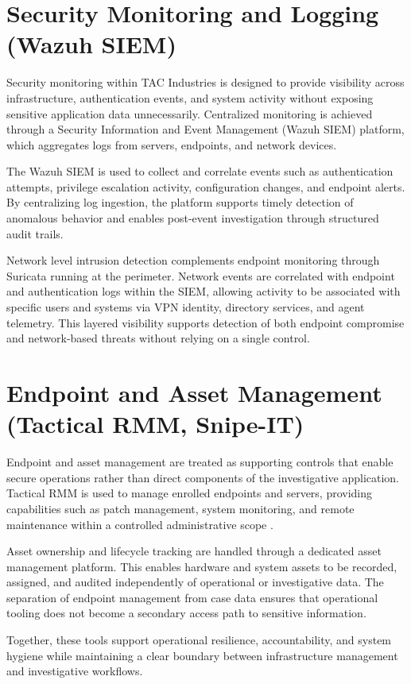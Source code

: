 \section{Security Monitoring and Logging (Wazuh SIEM)}

Security monitoring within TAC Industries is designed to provide visibility across infrastructure, authentication events, and system activity without exposing sensitive application data unnecessarily. Centralized monitoring is achieved through a Security Information and Event Management (Wazuh SIEM) platform, which aggregates logs from servers, endpoints, and network devices\cite{wazuh}.

The Wazuh SIEM is used to collect and correlate events such as authentication attempts, privilege escalation activity, configuration changes, and endpoint alerts. By centralizing log ingestion, the platform supports timely detection of anomalous behavior and enables post-event investigation through structured audit trails\cite{nist80092}.

Network level intrusion detection complements endpoint monitoring through Suricata running at the perimeter. Network events are correlated with endpoint and authentication logs within the SIEM, allowing activity to be associated with specific users and systems via VPN identity, directory services, and agent telemetry. This layered visibility supports detection of both endpoint compromise and network-based threats without relying on a single control.

\section{Endpoint and Asset Management (Tactical RMM, Snipe-IT)}

Endpoint and asset management are treated as supporting controls that enable secure operations rather than direct components of the investigative application. Tactical RMM is used to manage enrolled endpoints and servers, providing capabilities such as patch management, system monitoring, and remote maintenance within a controlled administrative scope \cite{tacticalRMM, snipeit}.

Asset ownership and lifecycle tracking are handled through a dedicated asset management platform. This enables hardware and system assets to be recorded, assigned, and audited independently of operational or investigative data. The separation of endpoint management from case data ensures that operational tooling does not become a secondary access path to sensitive information.

Together, these tools support operational resilience, accountability, and system hygiene while maintaining a clear boundary between infrastructure management and investigative workflows.


